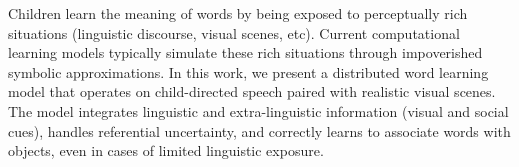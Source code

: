 Children learn the meaning of words by being exposed to perceptually rich situations (linguistic discourse, visual scenes, etc). Current computational learning models typically simulate these rich situations through impoverished symbolic approximations. In this work, we present a distributed word learning model that operates on child-directed speech paired with realistic visual scenes. The model integrates linguistic and extra-linguistic information (visual and social cues), handles referential uncertainty, and correctly learns to associate words with objects, even in cases of limited linguistic exposure.

